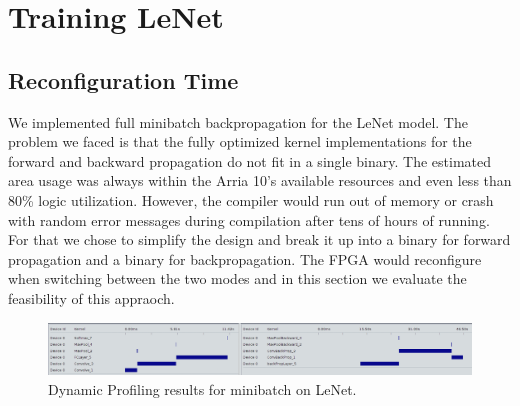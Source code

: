 
\newpage
\section{Training LeNet}

\subsection{Reconfiguration Time}

We implemented full minibatch backpropagation for the LeNet model. The problem we faced is that the fully optimized kernel implementations for the forward and backward propagation do not fit in a single binary. The estimated area usage was always within the Arria 10's available resources and even less than 80\% logic utilization. However, the compiler would run out of memory or crash with random error messages during compilation after tens of hours of running. For that we chose to simplify the design and break it up into a binary for forward propagation and a binary for backpropagation. The FPGA would reconfigure when switching between the two modes and in this section we evaluate the feasibility of this appraoch.

\begin{figure}[h!]
\centering
\includegraphics[width=1.0\textwidth]{Figures/fullprop}
\decoRule
\caption[fullprop]{ Dynamic Profiling results for minibatch on LeNet. }
\label{fig:fullprop}
\end{figure}

